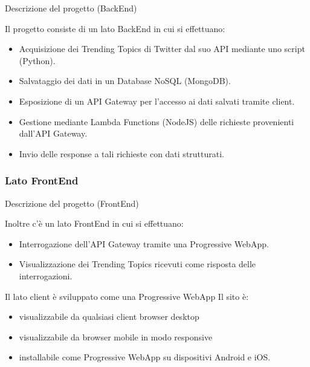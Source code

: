\documentclass[xcolor=svgnames, aspectratio=169]{beamer}
\begin{document}
\begin{frame}{Descrizione del progetto (BackEnd)}
    \begin{block}{Il progetto consiste di un lato BackEnd in cui si effettuano:}
        \begin{itemize}
            \item Acquisizione dei Trending Topics di Twitter dal suo API mediante uno script (Python).
            \item Salvataggio dei dati in un Database NoSQL (MongoDB).
            \item Esposizione di un API Gateway per l'accesso ai dati salvati tramite client.
            \item Gestione mediante Lambda Functions (NodeJS) delle richieste provenienti dall'API Gateway.
            \item Invio delle response a tali richieste con dati strutturati.
        \end{itemize}
    \end{block}
\end{frame}


\subsubsection{Lato FrontEnd}

\begin{frame}{Descrizione del progetto (FrontEnd)}
    \begin{block}{Inoltre c'è un lato FrontEnd in cui si effettuano:}
        \begin{itemize}
            \item Interrogazione dell'API Gateway tramite una Progressive WebApp.
            \item Visualizzazione dei Trending Topics ricevuti come risposta delle interrogazioni.
        \end{itemize}
    \end{block}
    
    \begin{block}{Il lato client è sviluppato come una Progressive WebApp}
        Il sito è:
        \begin{itemize}
            \item visualizzabile da qualsiasi client browser desktop
            \item visualizzabile da browser mobile in modo responsive
            \item installabile come Progressive WebApp su dispositivi Android e iOS.
        \end{itemize}
    \end{block}
\end{frame}
\end{document}
